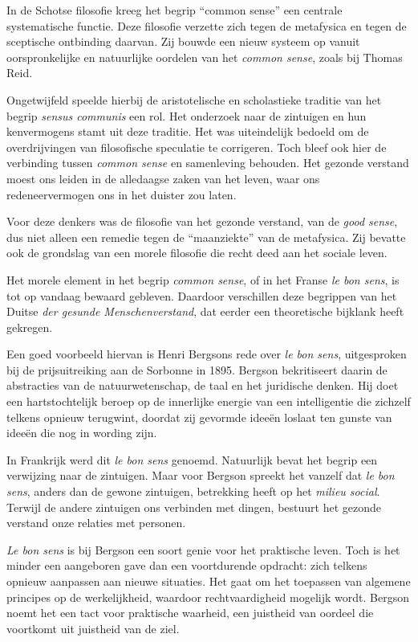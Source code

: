 In de Schotse filosofie kreeg het begrip ``common sense'' een centrale systematische functie. Deze filosofie verzette zich tegen de metafysica en tegen de sceptische ontbinding daarvan. Zij bouwde een nieuw systeem op vanuit oorspronkelijke en natuurlijke oordelen van het \textit{common sense}, zoals bij Thomas Reid.

Ongetwijfeld speelde hierbij de aristotelische en scholastieke traditie van het begrip \textit{sensus communis} een rol. Het onderzoek naar de zintuigen en hun kenvermogens stamt uit deze traditie. Het was uiteindelijk bedoeld om de overdrijvingen van filosofische speculatie te corrigeren. Toch bleef ook hier de verbinding tussen \textit{common sense} en samenleving behouden. Het gezonde verstand moest ons leiden in de alledaagse zaken van het leven, waar ons redeneervermogen ons in het duister zou laten.

Voor deze denkers was de filosofie van het gezonde verstand, van de \textit{good sense}, dus niet alleen een remedie tegen de ``maanziekte'' van de metafysica. Zij bevatte ook de grondslag van een morele filosofie die recht deed aan het sociale leven.

Het morele element in het begrip \textit{common sense}, of in het Franse \textit{le bon sens}, is tot op vandaag bewaard gebleven. Daardoor verschillen deze begrippen van het Duitse \textit{der gesunde Menschenverstand}, dat eerder een theoretische bijklank heeft gekregen.

Een goed voorbeeld hiervan is Henri Bergsons rede over \textit{le bon sens}, uitgesproken bij de prijsuitreiking aan de Sorbonne in 1895. Bergson bekritiseert daarin de abstracties van de natuurwetenschap, de taal en het juridische denken. Hij doet een hartstochtelijk beroep op de innerlijke energie van een intelligentie die zichzelf telkens opnieuw terugwint, doordat zij gevormde ideeën loslaat ten gunste van ideeën die nog in wording zijn.

In Frankrijk werd dit \textit{le bon sens} genoemd. Natuurlijk bevat het begrip een verwijzing naar de zintuigen. Maar voor Bergson spreekt het vanzelf dat \textit{le bon sens}, anders dan de gewone zintuigen, betrekking heeft op het \textit{milieu social}. Terwijl de andere zintuigen ons verbinden met dingen, bestuurt het gezonde verstand onze relaties met personen.

\textit{Le bon sens} is bij Bergson een soort genie voor het praktische leven. Toch is het minder een aangeboren gave dan een voortdurende opdracht: zich telkens opnieuw aanpassen aan nieuwe situaties. Het gaat om het toepassen van algemene principes op de werkelijkheid, waardoor rechtvaardigheid mogelijk wordt. Bergson noemt het een tact voor praktische waarheid, een juistheid van oordeel die voortkomt uit juistheid van de ziel.

